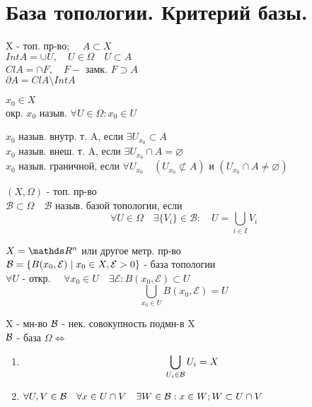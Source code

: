 \documentclass[geometry.tex]{subfiles}
\begin{document}
  \section{База топологии. Критерий базы.}

  \begin{definition}
      X - топ. пр-во; $\quad A \subset X$ \\
      $Int A = \cup U, \quad U \in \Omega \quad U \subset A$\\
      $Cl A = \cap F, \quad F - $ замк. $F \supset A$ \\
      $\partial A = Cl A \setminus Int A$
  \end{definition}

  \begin{definition}
      $x_0 \in X$\\
      окр. $x_0$ назыв. $\forall U \in \Omega: x_0 \in U$
  \end{definition}

  \begin{definition}
      $x_0$ назыв. внутр. т. A, если $\exists U_{x_0} \subset A$\\
      $x_0$ назыв. внеш. т. A, если $\exists U_{x_0} \cap A = \varnothing$\\
      $x_0$ назыв. граничной, если $\forall U_{x_0} \quad (U_{x_0} \not \subset A)$ и $(U_{x_0} \cap A \neq \varnothing)$
  \end{definition}

  \begin{definition}
      $(X, \Omega)$ - топ. пр-во\\
      $\mathcal{B} \subset \Omega \quad \mathcal{B}$ назыв. базой топологии, если\\
      \[\forall U \in \Omega \quad \exists \{V_i\} \in \mathcal{B}: \quad U = \bigcup_{i \in I} V_i\]
  \end{definition}

  \begin{example}
      $X = \R^n$ или другое метр. пр-во\\
      $\mathcal{B} = \{B(x_0, \mathcal{E}) \; | \; x_0 \in X, \mathcal{E} > 0\}$ - база топологии\\
      $\forall U$ - откр. $\quad \forall x_0 \in U \quad \exists \mathcal{E}: B(x_0, \mathcal{E}) \subset U$\\
      \[\bigcup_{x_0 \in U} B(x_0, \mathcal{E}) = U\]
  \end{example}

  \begin{theorem}
      X - мн-во $\mathcal{B}$ - нек. совокупность подмн-в X\\
      $\mathcal{B}$ - база $\Omega \Leftrightarrow$ \begin{enumerate}
          \item \[\bigcup_{U_i \in \mathcal{B}} U_i = X\]
          \item $\forall U, V \in \mathcal{B} \quad \forall x \in U \cap V \quad \exists W \in \mathcal{B} : x \in W; W \subset U\cap V$
      \end{enumerate}
  \end{theorem}
\end{document}
